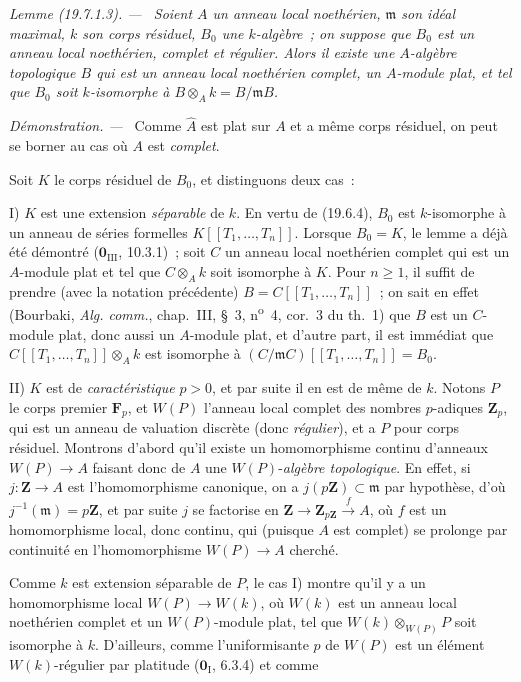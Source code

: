 \documentclass[10pt,oneside]{book}
\makeatletter
\newcommand{\setmanualcurrentlabel}[1]{\def\@currentlabel{#1}}
\newenvironment{lemma}[1][]{%
  \setmanualcurrentlabel{#1}\par\medskip\noindent\itshape Lemme (#1). ---\ }{\par}
\newenvironment{proof}{%
  \par\medskip\noindent\textit{Démonstration. ---\ }}{\par}
\makeatother
\begin{document}
\begin{lemma}[19.7.1.3]
\label{0.19.7.1.3-fr}
Soient $A$ un anneau local noethérien, $\mathfrak m$ son idéal maximal, $k$ son
corps résiduel, $B_0$ une $k$-algèbre~; on suppose que $B_0$ est un anneau
local noethérien, complet et régulier. Alors il existe une $A$-algèbre
topologique $B$ qui est un anneau local noethérien complet, un $A$-module plat,
et tel que $B_0$ soit $k$-isomorphe à
$B\otimes_A k=B/\mathfrak mB$.
\end{lemma}

\begin{proof}
Comme $\widehat A$ est plat sur $A$ et a même corps résiduel, on peut se borner
au cas où $A$ est \emph{complet}.

Soit $K$ le corps résiduel de $B_0$, et distinguons deux cas~:

\medskip
\noindent I) $K$ est une extension \emph{séparable} de $k$. En vertu de
(19.6.4), $B_0$ est $k$-isomorphe à un anneau de séries formelles
$K[[T_1,\ldots,T_n]]$. Lorsque $B_0=K$, le lemme a déjà été démontré
($\mathbf 0_{\mathrm{III}}$, 10.3.1)~; soit $C$ un anneau local noethérien
complet qui est un $A$-module plat et tel que $C\otimes_A k$ soit isomorphe à
$K$. Pour $n\geq1$, il suffit de prendre (avec la notation précédente)
$B=C[[T_1,\ldots,T_n]]$~; on sait en effet (Bourbaki,
\emph{Alg. comm.}, chap.~III, §~3, n\textsuperscript{o}~4, cor.~3 du th.~1)
que $B$ est un $C$-module plat, donc aussi un $A$-module plat, et d'autre part,
il est immédiat que $C[[T_1,\ldots,T_n]]\otimes_A k$ est isomorphe à
$(C/\mathfrak mC)[[T_1,\ldots,T_n]]=B_0$.

\medskip
\noindent II) $K$ est de \emph{caractéristique} $p>0$, et par suite il en est
de même de $k$. Notons $P$ le corps premier $\mathbf F_p$, et $W(P)$ l'anneau
local complet des nombres $p$-adiques $\mathbf Z_p$, qui est un anneau de
valuation discrète (donc \emph{régulier}), et a $P$ pour corps résiduel.
Montrons d'abord qu'il existe un homomorphisme continu d'anneaux $W(P)\to A$
faisant donc de $A$ une $W(P)$-\emph{algèbre topologique}. En effet, si
$j:\mathbf Z\to A$ est l'homomorphisme canonique, on a
$j(p\mathbf Z)\subset\mathfrak m$ par hypothèse, d'où
$j^{-1}(\mathfrak m)=p\mathbf Z$, et par suite $j$ se factorise en
$\mathbf Z\to\mathbf Z_{p\mathbf Z}\xrightarrow{f}A$, où $f$ est un
homomorphisme local, donc continu, qui (puisque $A$ est complet) se prolonge
par continuité en l'homomorphisme $W(P)\to A$ cherché.

Comme $k$ est extension séparable de $P$, le cas I) montre qu'il y a un
homomorphisme local $W(P)\to W(k)$, où $W(k)$ est un anneau local noethérien
complet et un $W(P)$-module plat, tel que $W(k)\otimes_{W(P)}P$ soit isomorphe
à $k$. D'ailleurs, comme l'uniformisante $p$ de $W(P)$ est un élément
$W(k)$-régulier par platitude ($\mathbf 0_{\mathrm I}$, 6.3.4) et comme


\end{proof}
\end{document}

